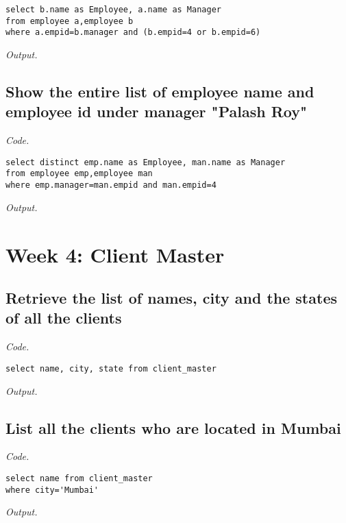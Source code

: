 \documentclass[12pt]{article}
\begin{document}
\begin{lstlisting}
select b.name as Employee, a.name as Manager 
from employee a,employee b
where a.empid=b.manager and (b.empid=4 or b.empid=6)
\end{lstlisting}

\textit{Output.}\\

\subsection{Show the entire list of employee name and employee id under manager "Palash Roy"}

\textit{Code.}

\begin{lstlisting}
select distinct emp.name as Employee, man.name as Manager 
from employee emp,employee man
where emp.manager=man.empid and man.empid=4
\end{lstlisting}

\textit{Output.}\\

\section{Week 4: Client Master}

\subsection{Retrieve the list of names, city and the states of all the clients}

\textit{Code.}

\begin{lstlisting}
select name, city, state from client_master
\end{lstlisting}

\textit{Output.}\\

\subsection{List all the clients who are located in Mumbai}

\textit{Code.}

\begin{lstlisting}
select name from client_master
where city='Mumbai'
\end{lstlisting}

\textit{Output.}\\
\end{document}
